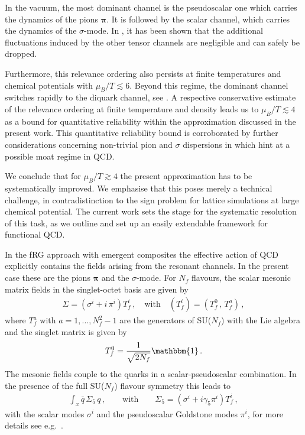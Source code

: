 \documentclass[aps,twocolumn,prd,superscriptaddress]{revtex4-2}
\begin{document}
In the vacuum, the most dominant channel is the pseudoscalar one which carries the dynamics of the pions $\boldsymbol{\pi}$. It is followed by the scalar channel, which carries the dynamics of the $\sigma$-mode. In \cite{Mitter:2014wpa, Cyrol:2017ewj}, it has been shown that the additional fluctuations induced by the other tensor channels are negligible and can safely be dropped.

Furthermore, this relevance ordering also persists at finite temperatures and chemical potentials with $\mu_B/T \lesssim 6$. Beyond this regime, the dominant channel switches rapidly to the diquark channel, see \cite{Braun:2019aow}. 
A respective conservative estimate of the relevance ordering at finite temperature and density leads us to $\mu_B/T \lesssim 4$ as a bound for quantitative reliability within the approximation discussed in the present work.
This quantitative reliability bound is corroborated by further considerations concerning non-trivial pion and $\sigma$ dispersions in \cite{Fu:2019hdw} which hint at a possible moat regime \cite{Pisarski:2021qof} in QCD. 

We conclude that for $\mu_B/T \gtrsim 4$ the present approximation has to be systematically improved. We emphasise that this poses merely a technical challenge, in contradistinction to the sign problem for lattice simulations at large chemical potential. The current work sets the stage for the systematic resolution of this task, as we outline and set up an easily extendable framework for functional QCD.

In the fRG approach with emergent composites the effective action of QCD explicitly contains the fields arising from the resonant channels. In the present case these are the pions $\boldsymbol{\pi}$ and the $\sigma$-mode. For $N_f$ flavours, the scalar mesonic matrix fields in the singlet-octet basis are given by 
%
\begin{align}
	\Sigma=\left(\sigma^i +i \,\pi^i\right) T_{f}^i \,,\quad \textrm{with}	\quad  \left(T^i _{f}\right) = ( T_f^0\,,\, T^a_f )  \,, 
	\label{eq:Sigma}
\end{align}
%
where $T^a_f$ with $a=1,...,N_f^2-1$ are the generators of SU($N_f$) with the Lie algebra  and the singlet matrix is given by 
%
\begin{align}
T^0_f =\frac{1}{\sqrt{2 N_f} }\mathbbm{1}\,.
\end{align}
%
The mesonic fields couple to the quarks in a scalar-pseudoscalar combination. In the presence of the full SU($N_f$) flavour symmetry this leads to 
%
\begin{align}
\int_x \bar q \,\Sigma_5 \, q\,,\qquad \textrm{with}\qquad  	\Sigma_5 = \left(\sigma^i +i \gamma_5 \pi^i\right) T_{f}^i\,,   
\end{align}
%
with the scalar modes $\sigma^i$ and the pseudoscalar Goldstone modes $\pi^i$, for more details see e.g.~\cite{Jungnickel:1996aa, Schaefer:2008hk, Mitter:2013fxa, Herbst:2013ufa, Rennecke:2016tkm, Wen:2018nkn, Fu:2018qsk, Fu:2019hdw}. 
\end{document}
